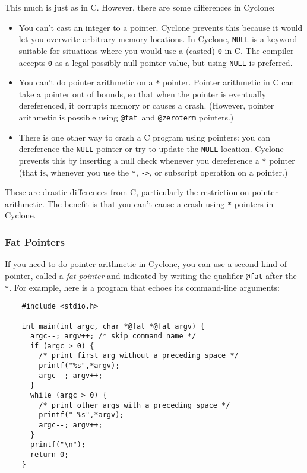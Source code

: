 This much is just as in C\@.  However, there are some differences in
Cyclone:
\begin{itemize}
\item You can't cast an integer to a pointer.  Cyclone prevents this
  because it would let you overwrite arbitrary memory locations.  In
  Cyclone, \texttt{NULL} is a keyword suitable for situations where
  you would use a (casted) \texttt{0} in C\@.  The compiler 
  accepts \texttt{0} as a legal possibly-null pointer value, but using
  \texttt{NULL} is preferred.
\item You can't do pointer arithmetic on a \texttt{*} pointer.
  Pointer arithmetic in C can take a pointer out of bounds, so that
  when the pointer is eventually dereferenced, it corrupts memory or
  causes a crash.  (However, pointer arithmetic is possible
  using \texttt{@fat}\ and \texttt{@zeroterm} pointers.)
\item There is one other way to crash a C program using pointers: you
  can dereference the \texttt{NULL} pointer or try to update the 
  \texttt{NULL} location.
  Cyclone prevents this by inserting a null check whenever you
  dereference a \texttt{*} pointer (that is, whenever you use the
  \texttt{*}, \texttt{->}, or subscript operation on a pointer.)
\end{itemize}

These are drastic differences from C, particularly the restriction on
pointer arithmetic.  The benefit is that you can't cause a crash using
\texttt{*} pointers in Cyclone.

\subsubsection*{Fat Pointers}

If you need to do pointer arithmetic in Cyclone, you can use a second
kind of pointer, called a \emph{fat pointer} and indicated by 
writing the qualifier \texttt{@fat} after the \texttt{*}.  For
example, here is a program that echoes its command-line arguments:
\begin{verbatim}
    #include <stdio.h>

    int main(int argc, char *@fat *@fat argv) {
      argc--; argv++; /* skip command name */
      if (argc > 0) {
        /* print first arg without a preceding space */
        printf("%s",*argv);
        argc--; argv++;
      }
      while (argc > 0) {
        /* print other args with a preceding space */
        printf(" %s",*argv);
        argc--; argv++;
      }
      printf("\n");
      return 0;
    }
\end{verbatim}

